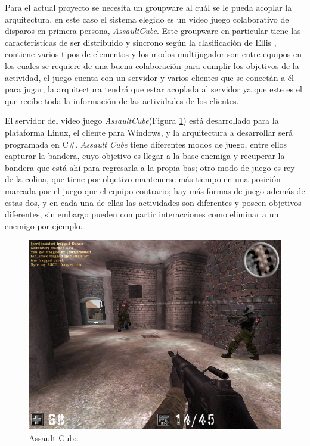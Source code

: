 Para el actual proyecto se necesita un groupware al cu\'al se le pueda acoplar la arquitectura, en este caso el sistema elegido es un video juego colaborativo de disparos en primera persona, \textit{AssaultCube}. Este groupware en particular tiene las caracter\'isticas de ser distribuido y s\'incrono seg\'un la clasificaci\'on de Ellis  	\cite{ellis1991groupware}, contiene varios tipos de elementos y los modos multijugador son entre equipos en los cuales se requiere de una buena colaboraci\'on para cumplir los objetivos de la actividad, el juego cuenta con un servidor y varios clientes que se conect\'an a \'el para jugar, la arquitectura tendr\'a que estar acoplada al servidor ya que este es el que recibe toda la informaci\'on de las actividades de los clientes.

El servidor del video juego \textit{AssaultCube}(Figura \ref{gw:asscb}) est\'a desarrollado para la plataforma Linux, el cliente para Windows, y la arquitectura a desarrollar ser\'a programada en C\#. \textit{Assault Cube} tiene diferentes modos de juego, entre ellos capturar la bandera, cuyo objetivo es llegar a la base enemiga y recuperar la bandera que est\'a ah\'i para regresarla a la propia bas; otro modo de juego es rey de la colina, que tiene por objetivo mantenerse m\'as tiempo en una posici\'on marcada por el juego que el equipo contrario; hay m\'as formas de juego adem\'as de estas dos, y en cada una de ellas las actividades son diferentes y poseen objetivos diferentes, sin embargo pueden compartir interacciones como eliminar a un enemigo por ejemplo. 

\begin{figure}[h!]
\centering
\includegraphics[scale=.25]{images/assaultcube}
\caption{Assault Cube}
\label{gw:asscb}
\end{figure}

